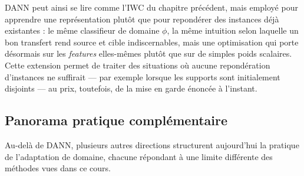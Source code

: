 \documentclass[11pt]{article}
\begin{document}
DANN peut ainsi se lire comme l'IWC du chapitre précédent, mais employé pour apprendre une représentation
plutôt que pour repondérer des instances déjà existantes : le même classifieur de domaine $\phi$, la même
intuition selon laquelle un bon transfert rend source et cible indiscernables, mais une optimisation qui
porte désormais sur les \emph{features} elles-mêmes plutôt que sur de simples poids scalaires. Cette
extension permet de traiter des situations où aucune repondération d'instances ne suffirait --- par
exemple lorsque les supports sont initialement disjoints --- au prix, toutefois, de la mise en garde
énoncée à l'instant.

\subsection{Panorama pratique complémentaire}

Au-delà de DANN, plusieurs autres directions structurent aujourd'hui la pratique de l'adaptation de
domaine, chacune répondant à une limite différente des méthodes vues dans ce cours.
\end{document}
